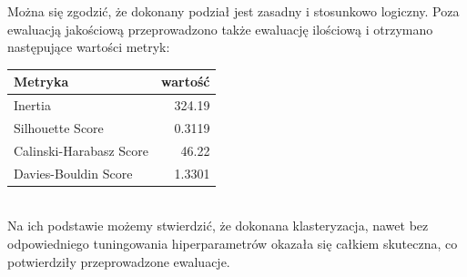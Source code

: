 \documentclass{article}
\begin{document}
Można się zgodzić, że dokonany podział jest zasadny i stosunkowo logiczny. Poza ewaluacją jakościową przeprowadzono także ewaluację ilościową i otrzymano następujące wartości metryk:\\
\begin{table}[!htbp]%
    \centering
    \begin{tabular}{l|r}
        Metryka & wartość \\ \hline
        Inertia & 324.19 \\
        Silhouette Score & 0.3119 \\
        Calinski-Harabasz Score & 46.22 \\
        Davies-Bouldin Score & 1.3301 \\
    \end{tabular}
\end{table}\\


Na ich podstawie możemy stwierdzić, że dokonana klasteryzacja, nawet bez odpowiedniego tuningowania hiperparametrów okazała się całkiem skuteczna, co potwierdziły przeprowadzone ewaluacje.

\vspace{1cm}
\hrulefill


\end{document}

